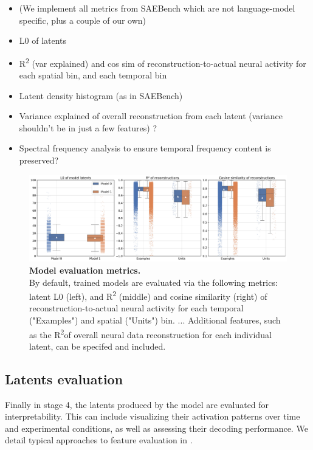 \begin{itemize}
    \item (We implement all metrics from SAEBench which are not language-model specific, plus a couple of our own)
    \item L0 of latents
    \item R\textsuperscript{2} (var explained) and cos sim of reconstruction-to-actual neural activity for each spatial bin, and each temporal bin
    \item Latent density histogram (as in SAEBench)
    \item Variance explained of overall reconstruction from each latent (variance shouldn't be in just a few features) ?
    \item Spectral frequency analysis to ensure temporal frequency content is preserved?
\end{itemize}

\begin{figure}[h]
    \centering
    \includegraphics[width=\linewidth]{figures/model_eval.pdf}
    \caption{
        \textbf{Model evaluation metrics.} \\
        \small By default, trained models are evaluated via the following metrics: latent L0 (left), and R\textsuperscript{2} (middle) and cosine similarity (right) of reconstruction-to-actual neural activity for each temporal ("Examples") and spatial ("Units") bin. ... Additional features, such as the R\textsuperscript{2}of overall neural data reconstruction for each individual latent, can be specifed and included.
    }
    \label{figure:model_eval}
\end{figure}

\subsection{Latents evaluation}

Finally in stage 4, the latents produced by the model are evaluated for interpretability. This can include visualizing their activation patterns over time and experimental conditions, as well as assessing their decoding performance. We detail typical approaches to feature evaluation in .

